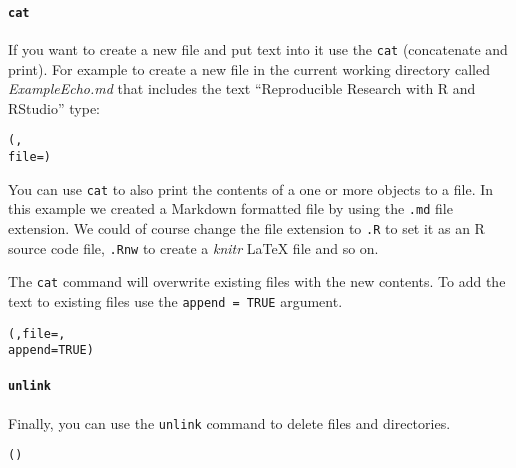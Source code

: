\paragraph{{\tt{cat}}}

If you want to create a new file and put text into it use the \texttt{cat} (concatenate and print). For example to create a new file in the current working directory called \emph{ExampleEcho.md} that includes the text ``Reproducible Research with R and RStudio'' type:

\begin{knitrout}
\color{fgcolor}\begin{kframe}
\begin{alltt}
(,
    file = )
\end{alltt}
\end{kframe}
\end{knitrout}


\noindent You can use \texttt{cat} to also print the contents of a one or more objects to a file. In this example we created a Markdown formatted file by using the \texttt{.md} file extension. We could of course change the file extension to \texttt{.R} to set it as an R source code file, \texttt{.Rnw} to create a \emph{knitr} LaTeX file and so on.

The \texttt{cat} command will overwrite existing files with the new contents. To add the text to existing files use the \texttt{append = TRUE} argument.

\begin{knitrout}
\color{fgcolor}\begin{kframe}
\begin{alltt}
(, file = ,
    append = TRUE)
\end{alltt}
\end{kframe}
\end{knitrout}


\paragraph{{\tt{unlink}}}

Finally, you can use the {\tt{unlink}} command to delete files and directories. 

\begin{knitrout}
\color{fgcolor}\begin{kframe}
\begin{alltt}
()
\end{alltt}
\end{kframe}
\end{knitrout}


